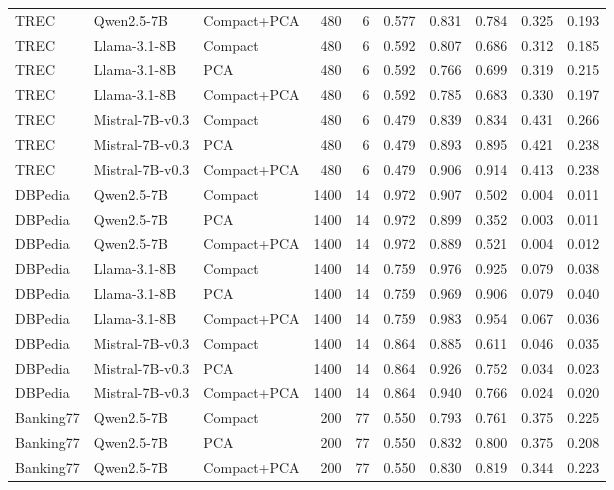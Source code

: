 \begin{longtable}{lllrrrrrrr}
TREC & Qwen2.5-7B & Compact+PCA & 480 & 6 & 0.577 & 0.831 & 0.784 & 0.325 & 0.193 \\
TREC & Llama-3.1-8B & Compact & 480 & 6 & 0.592 & 0.807 & 0.686 & 0.312 & 0.185 \\
TREC & Llama-3.1-8B & PCA & 480 & 6 & 0.592 & 0.766 & 0.699 & 0.319 & 0.215 \\
TREC & Llama-3.1-8B & Compact+PCA & 480 & 6 & 0.592 & 0.785 & 0.683 & 0.330 & 0.197 \\
TREC & Mistral-7B-v0.3 & Compact & 480 & 6 & 0.479 & 0.839 & 0.834 & 0.431 & 0.266 \\
TREC & Mistral-7B-v0.3 & PCA & 480 & 6 & 0.479 & 0.893 & 0.895 & 0.421 & 0.238 \\
TREC & Mistral-7B-v0.3 & Compact+PCA & 480 & 6 & 0.479 & 0.906 & 0.914 & 0.413 & 0.238 \\
DBPedia & Qwen2.5-7B & Compact & 1400 & 14 & 0.972 & 0.907 & 0.502 & 0.004 & 0.011 \\
DBPedia & Qwen2.5-7B & PCA & 1400 & 14 & 0.972 & 0.899 & 0.352 & 0.003 & 0.011 \\
DBPedia & Qwen2.5-7B & Compact+PCA & 1400 & 14 & 0.972 & 0.889 & 0.521 & 0.004 & 0.012 \\
DBPedia & Llama-3.1-8B & Compact & 1400 & 14 & 0.759 & 0.976 & 0.925 & 0.079 & 0.038 \\
DBPedia & Llama-3.1-8B & PCA & 1400 & 14 & 0.759 & 0.969 & 0.906 & 0.079 & 0.040 \\
DBPedia & Llama-3.1-8B & Compact+PCA & 1400 & 14 & 0.759 & 0.983 & 0.954 & 0.067 & 0.036 \\
DBPedia & Mistral-7B-v0.3 & Compact & 1400 & 14 & 0.864 & 0.885 & 0.611 & 0.046 & 0.035 \\
DBPedia & Mistral-7B-v0.3 & PCA & 1400 & 14 & 0.864 & 0.926 & 0.752 & 0.034 & 0.023 \\
DBPedia & Mistral-7B-v0.3 & Compact+PCA & 1400 & 14 & 0.864 & 0.940 & 0.766 & 0.024 & 0.020 \\
Banking77 & Qwen2.5-7B & Compact & 200 & 77 & 0.550 & 0.793 & 0.761 & 0.375 & 0.225 \\
Banking77 & Qwen2.5-7B & PCA & 200 & 77 & 0.550 & 0.832 & 0.800 & 0.375 & 0.208 \\
Banking77 & Qwen2.5-7B & Compact+PCA & 200 & 77 & 0.550 & 0.830 & 0.819 & 0.344 & 0.223 \\
\end{longtable}
\normalsize
